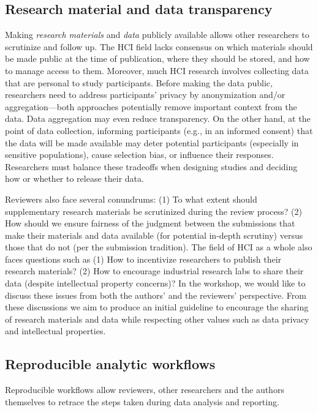 \documentclass[sigchi-a, authorversion]{acmart}
\begin{document}
\subsection{Research material and data transparency}
Making \emph{research materials} and \emph{data} publicly available allows other researchers to scrutinize and follow up. The HCI field lacks consensus on which materials should be made public at the time of publication, where they should be stored, and how to manage access to them. Moreover, much HCI research involves collecting data that are personal to study participants. Before making the data public, researchers need to address participants' privacy by anonymization and/or aggregation---both approaches potentially remove important context from the data. Data aggregation may even reduce transparency. On the other hand, at the point of data collection, informing participants (e.g., in an informed consent) that the data will be made available may deter potential participants (especially in sensitive populations), cause selection bias, or influence their responses. Researchers must balance these tradeoffs when designing studies and deciding how or whether to release their data.


Reviewers also face several conundrums: (1) To what extent should supplementary research materials be scrutinized during the review process? (2) How should we ensure fairness of the judgment between the submissions that make their materials and data available (for potential in-depth scrutiny) versus those that do not (per the submission tradition). The field of HCI as a whole also faces questions such as (1) How to incentivize researchers to publish their research materials? (2) How to encourage industrial research labs to share their data (despite intellectual property concerns)? In the workshop, we would like to discuss these issues from both the authors' and the reviewers' perspective. From these discussions we aim to produce an initial guideline to encourage the sharing of research materials and data while respecting other values such as data privacy and intellectual properties.





\subsection{Reproducible analytic workflows}

Reproducible workflows allow reviewers, other researchers and the authors themselves to retrace the steps taken during data analysis and reporting. 
\end{document}
